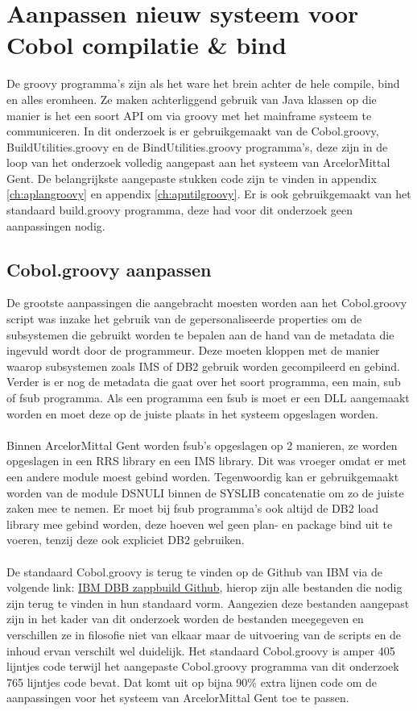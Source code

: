 \section{Aanpassen nieuw systeem voor Cobol compilatie \& bind}
De groovy programma's zijn als het ware het brein achter de hele compile, bind en alles eromheen. Ze maken achterliggend gebruik van Java klassen op die manier is het een soort API om via groovy met het mainframe systeem te communiceren. In dit onderzoek is er gebruikgemaakt van de Cobol.groovy, BuildUtilities.groovy en de BindUtilities.groovy programma's, deze zijn in de loop van het onderzoek volledig aangepast aan het systeem van ArcelorMittal Gent. De belangrijkste aangepaste stukken code zijn te vinden in appendix \ref{ch:aplangroovy} en appendix \ref{ch:aputilgroovy}. Er is ook gebruikgemaakt van het standaard build.groovy programma, deze had voor dit onderzoek geen aanpassingen nodig. 

\subsection{Cobol.groovy aanpassen}
\label{subsec:cobol.groovy aanpassen}
De grootste aanpassingen die aangebracht moesten worden aan het Cobol.groovy script was inzake het gebruik van de gepersonaliseerde properties om de subsystemen die gebruikt worden te bepalen aan de hand van de metadata die ingevuld wordt door de programmeur. Deze moeten kloppen met de manier waarop subsystemen zoals IMS of DB2 gebruik worden gecompileerd en gebind. Verder is er nog de metadata die gaat over het soort programma, een main, sub of fsub programma. Als een programma een fsub is moet er een DLL aangemaakt worden en moet deze op de juiste plaats in het systeem opgeslagen worden.
\\ \\
Binnen ArcelorMittal Gent worden fsub's opgeslagen op 2 manieren, ze worden opgeslagen in een RRS library en een IMS library. Dit was vroeger omdat er met een andere module moest gebind worden. Tegenwoordig kan er gebruikgemaakt worden van de module DSNULI binnen de SYSLIB concatenatie om zo de juiste zaken mee te nemen. Er moet bij fsub programma's ook altijd de DB2 load library mee gebind worden, deze hoeven wel geen plan- en package bind uit te voeren, tenzij deze ook expliciet DB2 gebruiken. 
\\ \\
De standaard Cobol.groovy is terug te vinden op de Github van IBM via de volgende link: \href{https://github.com/IBM/dbb-zappbuild}{IBM DBB zappbuild Github}, hierop zijn alle bestanden die nodig zijn terug te vinden in hun standaard vorm. Aangezien deze bestanden aangepast zijn in het kader van dit onderzoek worden de bestanden meegegeven en verschillen ze in filosofie niet van elkaar maar de uitvoering van de scripts en de inhoud ervan verschilt wel duidelijk. 
Het standaard Cobol.groovy is amper 405 lijntjes code terwijl het aangepaste Cobol.groovy programma van dit onderzoek 765 lijntjes code bevat. Dat komt uit op bijna 90\% extra lijnen code om de aanpassingen voor het systeem van ArcelorMittal Gent toe te passen.

